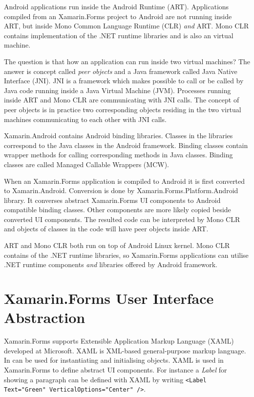 \documentclass[conference]{IEEEtran}
\newcommand{\code}[1]{\texttt{#1}}
\begin{document}
Android applications run inside the Android Runtime (ART). Applications compiled from an Xamarin.Forms project to Android are not running inside ART, but inside Mono Common Language Runtime (CLR) \emph{and} ART. Mono CLR contains implementation of the .NET runtime libraries and is also an virtual machine.

The question is that how an application can run inside two virtual machines? The answer is concept called \emph{peer objects} and a Java framework called Java Native Interface (JNI). JNI is a framework which makes possible to call or be called by Java code running inside a Java Virtual Machine (JVM). Processes running inside ART and Mono CLR are communicating with JNI calls. The concept of peer objects is in practice two corresponding objects residing in the two virtual machines communicating to each other with JNI calls.

Xamarin.Android contains Android binding libraries. Classes in the libraries correspond to the Java classes in the Android framework. Binding classes contain wrapper methods for calling corresponding methods in Java classes. Binding classes are called Managed Callable Wrappers (MCW).

When an Xamarin.Forms application is compiled to Android it is first converted to Xamarin.Android. Conversion is done by Xamarin.Forms.Platform.Android library. It converses abstract Xamarin.Forms UI components to Android compatible binding classes. Other components are more likely copied beside converted UI components. The resulted code can be interpreted by Mono CLR and objects of classes in the code will have peer objects inside ART.

ART and Mono CLR both run on top of Android Linux kernel. Mono CLR contains of the .NET runtime libraries, so Xamarin.Forms applications can utilise .NET runtime components \emph{and} libraries offered by Android framework.

\section{Xamarin.Forms User Interface Abstraction}

Xamarin.Forms supports Extensible Application Markup Language (XAML) developed at Microsoft. XAML is XML-based general-purpose markup language. In can be used for instantiating and initialising objects. XAML is used in Xamarin.Forms to define abstract UI components. For instance a \emph{Label} for showing a paragraph can be defined with XAML by writing \code{<Label Text="Green" VerticalOptions="Center" />}.

\nocite{xamarin}
\nocite{xamarin2}
\nocite{xamarin3}


\end{document}
